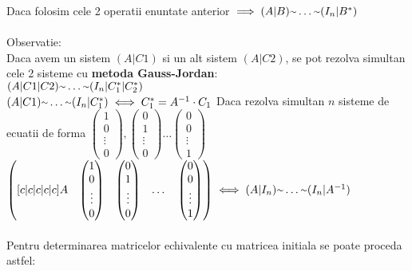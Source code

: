 \documentclass{article}
\newcommand{\mytilde}{\raise.17ex\hbox{$\scriptstyle\mathtt{\sim}$}}
\begin{document}
        Daca folosim cele 2 operatii enuntate anterior $\implies (A|B) \mytilde \dots \mytilde (I_n|B^*)$\\ \\
        Observatie:\\
        Daca avem un sistem $(A|C1)$ si un alt sistem $(A|C2)$, se pot rezolva simultan cele 2 sisteme cu \textbf{metoda Gauss-Jordan}:\\
        $(A|C1|C2)\mytilde \dots \mytilde (I_n|C_1^*|C_2^*)$\\
        $(A|C1) \mytilde \dots \mytilde (I_n|C_1^*) \iff C_1^* = A^{-1} \cdot C_1$
        Daca rezolva simultan $n$ sisteme de ecuatii de forma $\begin{pmatrix} 1\\0\\ \vdots\\ 0 \end{pmatrix}, \begin{pmatrix} 0\\1\\ \vdots\\ 0 \end{pmatrix}
            \dots \begin{pmatrix} 0\\0\\ \vdots\\ 1 \end{pmatrix}$\\
                $\begin{pmatrix}[c|c|c|c|c] A&\begin{pmatrix} 1\\0\\ \vdots\\ 0 \end{pmatrix}& \begin{pmatrix} 0\\1\\ \vdots\\ 0 \end{pmatrix}& \dots &
                    \begin{pmatrix}0\\0\\ \vdots\\ 1\end{pmatrix}\end{pmatrix} \iff (A|I_n) \mytilde \dots \mytilde (I_n|A^{-1})$ \\ \\
        Pentru determinarea matricelor echivalente cu matricea initiala se poate proceda astfel:
\end{document}
